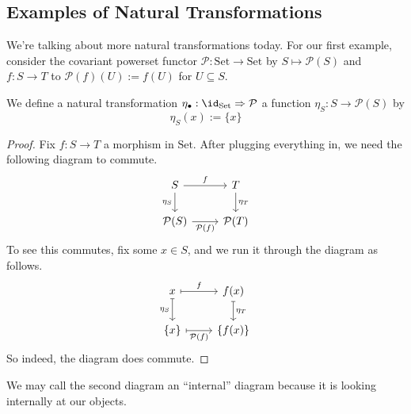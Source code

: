 
\subsection{Examples of Natural Transformations}
We're talking about more natural transformations today. For our first example, consider the covariant powerset functor $\mathcal P:\mathrm{Set}\to\mathrm{Set}$ by $S\mapsto\mathcal P(S)$ and $f:S\to T$ to $\mathcal P(f)(U):=f(U)$ for $U\subseteq S$.
\begin{exe}
	 We define a natural transformation $\eta_\bullet:\id_{\mathrm{Set}}\Rightarrow\mathcal P$ a function $\eta_S:S\to\mathcal P(S)$ by
	\[\eta_S(x):=\{x\}\]
\end{exe}
\begin{proof}
	Fix $f:S\to T$ a morphism in $\mathrm{Set}$. After plugging everything in, we need the following diagram to commute.
	\[\begin{tikzcd}
		S & T \\
		{\mathcal P(S)} & {\mathcal P(T)}
		\arrow["{\mathcal P(f)}"', from=2-1, to=2-2]
		\arrow["{\eta_S}"', from=1-1, to=2-1]
		\arrow["{\eta_T}", from=1-2, to=2-2]
		\arrow["f", from=1-1, to=1-2]
	\end{tikzcd}\]
	To see this commutes, fix some $x\in S$, and we run it through the diagram as follows.
	\[\begin{tikzcd}
		x & {f(x)} \\
		{\{x\}} & {\{f(x)\}}
		\arrow["{\eta_S}"', maps to, from=1-1, to=2-1]
		\arrow["{\eta_T}", maps to, from=1-2, to=2-2]
		\arrow["f", maps to, from=1-1, to=1-2]
		\arrow["{\mathcal P(f)}"', maps to, from=2-1, to=2-2]
	\end{tikzcd}\]
	So indeed, the diagram does commute.
\end{proof}
\begin{remark}
	We may call the second diagram an ``internal'' diagram because it is looking internally at our objects.
\end{remark}

